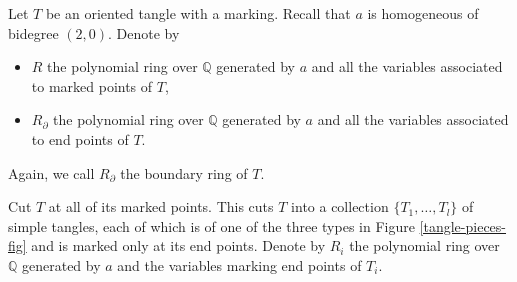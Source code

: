 \documentclass{amsart}
\theoremstyle{plain}
\theoremstyle{definition}
\theoremstyle{remark}
\numberwithin{equation}{section}
\begin{document}
Let $T$ be an oriented tangle with a marking. Recall that $a$ is homogeneous of bidegree $(2,0)$. Denote by 
\begin{itemize}
	\item $R$ the polynomial ring over ${\mathbb{Q}}$ generated by $a$ and all the variables associated to marked points of $T$, 
	\item $R_\partial$ the polynomial ring over ${\mathbb{Q}}$ generated by $a$ and all the variables associated to end points of $T$.  
\end{itemize}
Again, we call $R_\partial$ the boundary ring of $T$.

Cut $T$ at all of its marked points. This cuts $T$ into a collection $\{T_1,\dots,T_l\}$ of simple tangles, each of which is of one of the three types in Figure \ref{tangle-pieces-fig} and is marked only at its end points. Denote by $R_i$ the polynomial ring over ${\mathbb{Q}}$ generated by $a$ and the variables marking end points of $T_i$.
\end{document}
